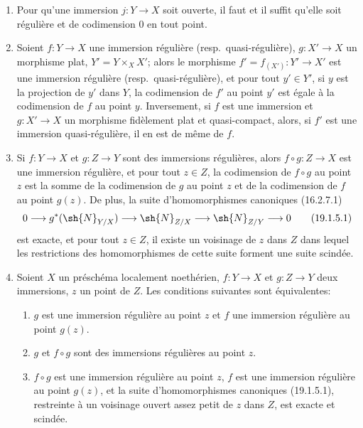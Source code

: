 \begin{proposition}[19.1.5]
\label{IV.19.1.5}
\begin{enumerate}
  \item[\textup{(i)}] Pour qu'une immersion $j:Y\to X$ soit ouverte, il faut et il suffit qu'elle soit régulière et de codimension $0$ en tout point.
  \item[\textup{(ii)}] Soient $f:Y\to X$ une immersion régulière \textup{(resp.}\ quasi-régulière\textup{)}, $g:X'\to X$ un morphisme plat, $Y'=Y\times_X X'$; alors le morphisme $f'=f_{(X')}:Y'\to X'$ est une immersion régulière \textup{(resp.}\ quasi-régulière\textup{)}, et pour tout $y'\in Y'$, si $y$ est la projection de $y'$ dans $Y$, la codimension de $f'$ au point $y'$ est égale à la codimension de $f$ au point $y$. Inversement, si $f$ est une immersion et $g:X'\to X$ un morphisme fidèlement plat et quasi-compact, alors, si $f'$ est une immersion quasi-régulière, il en est de même de $f$.
  \item[\textup{(iii)}] Si $f:Y\to X$ et $g:Z\to Y$ sont des immersions régulières, alors $f\circ g:Z\to X$ est une immersion régulière, et pour tout $z\in Z$, la codimension de $f\circ g$ au point $z$ est la somme de la codimension de $g$ au point $z$ et de la codimension de $f$ au point $g(z)$. De plus, la suite d'homomorphismes canoniques \textup{(16.2.7.1)}
\begin{equation}
  0\longrightarrow g^*(\sh{N}_{Y/X})\longrightarrow\sh{N}_{Z/X}\longrightarrow\sh{N}_{Z/Y}\longrightarrow0
  \tag{19.1.5.1}\label{IV.19.1.5.1}
\end{equation}
est exacte, et pour tout $z\in Z$, il existe un voisinage de $z$ dans $Z$ dans lequel les restrictions des homomorphismes de cette suite forment une suite scindée.
  \item[\textup{(iv)}] Soient $X$ un préschéma localement noethérien, $f:Y\to X$ et $g:Z\to Y$ deux immersions, $z$ un point de $Z$. Les conditions suivantes sont équivalentes:
  \begin{enumerate}
    \item[\textup{a)}] $g$ est une immersion régulière au point $z$ et $f$ une immersion régulière au point $g(z)$.
    \item[\textup{b)}] $g$ et $f\circ g$ sont des immersions régulières au point $z$.
    \item[\textup{c)}] $f\circ g$ est une immersion régulière au point $z$, $f$ est une immersion régulière au point $g(z)$, et la suite d'homomorphismes canoniques \textup{(19.1.5.1)}, restreinte à un voisinage ouvert assez petit de $z$ dans $Z$, est exacte et scindée.

\end{enumerate}
\end{enumerate}
\end{proposition}
